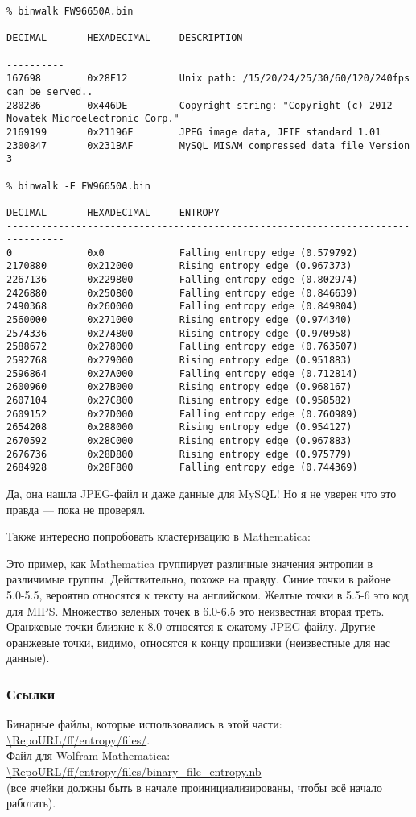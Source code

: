 \begin{lstlisting}
% binwalk FW96650A.bin 

DECIMAL       HEXADECIMAL     DESCRIPTION
--------------------------------------------------------------------------------
167698        0x28F12         Unix path: /15/20/24/25/30/60/120/240fps can be served..
280286        0x446DE         Copyright string: "Copyright (c) 2012 Novatek Microelectronic Corp."
2169199       0x21196F        JPEG image data, JFIF standard 1.01
2300847       0x231BAF        MySQL MISAM compressed data file Version 3

% binwalk -E FW96650A.bin 

DECIMAL       HEXADECIMAL     ENTROPY
--------------------------------------------------------------------------------
0             0x0             Falling entropy edge (0.579792)
2170880       0x212000        Rising entropy edge (0.967373)
2267136       0x229800        Falling entropy edge (0.802974)
2426880       0x250800        Falling entropy edge (0.846639)
2490368       0x260000        Falling entropy edge (0.849804)
2560000       0x271000        Rising entropy edge (0.974340)
2574336       0x274800        Rising entropy edge (0.970958)
2588672       0x278000        Falling entropy edge (0.763507)
2592768       0x279000        Rising entropy edge (0.951883)
2596864       0x27A000        Falling entropy edge (0.712814)
2600960       0x27B000        Rising entropy edge (0.968167)
2607104       0x27C800        Rising entropy edge (0.958582)
2609152       0x27D000        Falling entropy edge (0.760989)
2654208       0x288000        Rising entropy edge (0.954127)
2670592       0x28C000        Rising entropy edge (0.967883)
2676736       0x28D800        Rising entropy edge (0.975779)
2684928       0x28F800        Falling entropy edge (0.744369)
\end{lstlisting}

Да, она нашла JPEG-файл и даже данные для MySQL!
Но я не уверен что это правда --- пока не проверял.

Также интересно попробовать кластеризацию в Mathematica:



Это пример, как Mathematica группирует различные значения энтропии в различимые группы.
Действительно, похоже на правду. Синие точки в районе 5.0-5.5, вероятно относятся к тексту на английском.
Желтые точки в 5.5-6 это код для MIPS. Множество зеленых точек в 6.0-6.5 это неизвестная вторая треть.
Оранжевые точки близкие к 8.0 относятся к сжатому JPEG-файлу.
Другие оранжевые точки, видимо, относятся к концу прошивки (неизвестные для нас данные).

\subsubsection{Ссылки}

Бинарные файлы, которые использовались в этой части:\\
\url{\RepoURL/ff/entropy/files/}.\\
Файл для Wolfram Mathematica: \\
\url{\RepoURL/ff/entropy/files/binary_file_entropy.nb} \\
(все ячейки должны быть в начале проинициализированы, чтобы всё начало работать).

